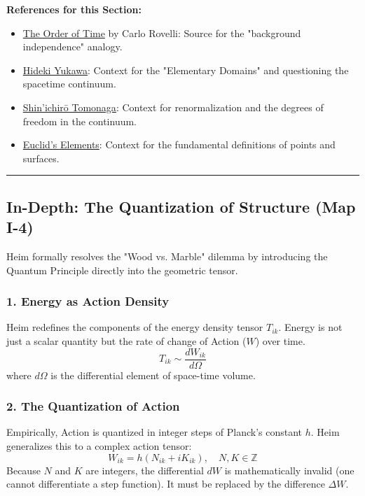 \documentclass[11pt,a4paper,oneside]{article}
\newenvironment{sectionrefs}
  {\par\vspace{1em}\noindent\textbf{\textsf{References for this Section:}}\begin{itemize}[leftmargin=*, label={\scriptsize$\blacksquare$}, itemsep=2pt]}
  {\end{itemize}}
\newcommand{\hr}{\par\vspace{2em}\noindent\rule{\linewidth}{0.4pt}\par\vspace{2em}}
\begin{document}
\begin{sectionrefs}
    \item \href{https://en.wikipedia.org/wiki/The_Order_of_Time}{The Order of Time} by Carlo Rovelli: Source for the "background independence" analogy.
    \item \href{https://en.wikipedia.org/wiki/Hideki_Yukawa}{Hideki Yukawa}: Context for the "Elementary Domains" and questioning the spacetime continuum.
    \item \href{https://en.wikipedia.org/wiki/Shin%E2%80%99ichir%C5%8D_Tomonaga}{Shin'ichirō Tomonaga}: Context for renormalization and the degrees of freedom in the continuum.
    \item \href{https://en.wikipedia.org/wiki/Euclid's_Elements}{Euclid's Elements}: Context for the fundamental definitions of points and surfaces.
\end{sectionrefs}

\hr

\subsection*{In-Depth: The Quantization of Structure (Map I-4)}

Heim formally resolves the "Wood vs. Marble" dilemma by introducing the Quantum Principle directly into the geometric tensor.

\subsubsection*{1. Energy as Action Density}
Heim redefines the components of the energy density tensor $T_{ik}$. Energy is not just a scalar quantity but the rate of change of Action ($W$) over time.
\begin{equation}
    T_{ik} \sim \frac{dW_{ik}}{d\Omega}
\end{equation}
where $d\Omega$ is the differential element of space-time volume.

\subsubsection*{2. The Quantization of Action}
Empirically, Action is quantized in integer steps of Planck's constant $h$. Heim generalizes this to a complex action tensor:
\begin{equation}
    W_{ik} = h(N_{ik} + iK_{ik}), \quad N, K \in \mathbb{Z}
\end{equation}
Because $N$ and $K$ are integers, the differential $dW$ is mathematically invalid (one cannot differentiate a step function). It must be replaced by the difference $\Delta W$.
\end{document}
